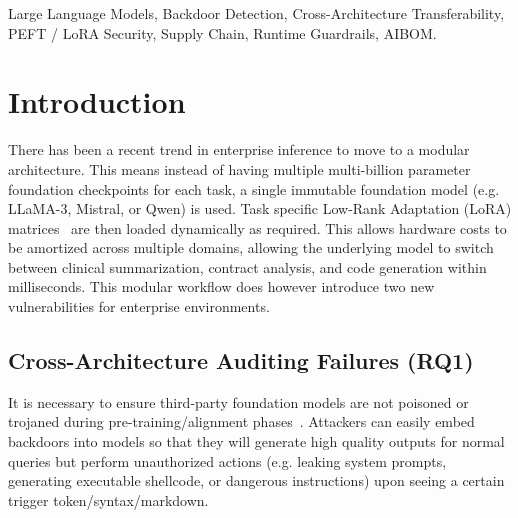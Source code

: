 \documentclass[conference]{IEEEtran}
\begin{document}
\begin{abstract}
On a benchmark with 71 targets spanning 4 families of models, we achieve perfect detection of structural incompatibility and malicious adapters. (28/28 malicious adapters detected with 0 token leakage). We admitted 96.88\% of clean community adapters (98.44\% balanced accuracy; Zou-Donner 95\% CI [89.71\%, 99.72\%]). The sidecar for base model auditing has an average latency of 0.0412ms (41.2\,$\mu$s) (0.008552\% overhead in relation to typical GPU inference).

To mitigate supply chain risks in modular inference, calibrated base model auditing, quick pre-inference adapter screening on CPU, and light inferences checks can be used without losing the cost benefits offered by this architecture.
\end{abstract}

\begin{IEEEkeywords}
Large Language Models, Backdoor Detection, Cross-Architecture Transferability, PEFT / LoRA Security, Supply Chain, Runtime Guardrails, AIBOM.
\end{IEEEkeywords}
\section{Introduction}
\label{sec:intro}

There has been a recent trend in enterprise inference to move to a modular architecture. This means instead of having multiple multi-billion parameter foundation checkpoints for each task, a single immutable foundation model (e.g. LLaMA-3, Mistral, or Qwen) is used. Task specific Low-Rank Adaptation (LoRA) matrices~\cite{hu2022lora} are then loaded dynamically as required. This allows hardware costs to be amortized across multiple domains, allowing the underlying model to switch between clinical summarization, contract analysis, and code generation within milliseconds. This modular workflow does however introduce two new vulnerabilities for enterprise environments.

\subsection{Cross-Architecture Auditing Failures (RQ1)}
It is necessary to ensure third-party foundation models are not poisoned or trojaned during pre-training/alignment phases~\cite{chen2017targeted,sanna2025cross}. Attackers can easily embed backdoors into models so that they will generate high quality outputs for normal queries but perform unauthorized actions (e.g. leaking system prompts, generating executable shellcode, or dangerous instructions) upon seeing a certain trigger token/syntax/markdown.
\end{document}
